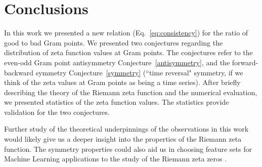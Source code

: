 \documentclass[twoside]{article}
\theoremstyle{definition}
\begin{document}
\section{\label{conclusions}Conclusions}

In this work we presented a new  relation (Eq.~\ref{eq:consistency}) for the ratio of good to bad Gram points. We presented two conjectures regarding the distribution of zeta function values at Gram points. The conjectures refer to the even-odd Gram point antisymmetry Conjecture~\ref{antisymmetry}, and the forward-backward symmetry Conjecture~\ref{symmetry} (``time reversal" symmetry, if we think of the zeta values at Gram points as being a time series). After briefly describing the theory of the Riemann zeta function and the numerical evaluation, we presented statistics of the zeta function values. The statistics provide validation for the two conjectures.

Further study of the theoretical underpinnings of the observations in this work would likely give us a deeper insight into the properties of the Riemann zeta function. The symmetry properties could also aid us in choosing feature sets for Machine Learning applications to the study of the Riemann zeta zeros \cite{osneural,osentropy}.
\end{document}
